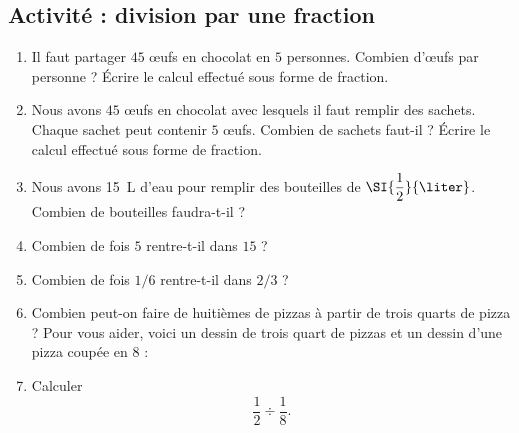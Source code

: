 
\subsection*{Activité : division par une fraction}

\begin{enumerate}
    \item
        Il faut partager \( 45\) œufs en chocolat en \( 5\) personnes. Combien d'œufs par personne ? Écrire le calcul effectué sous forme de fraction.
    \item
        Nous avons \( 45\) œufs en chocolat avec lesquels il faut remplir des sachets. Chaque sachet peut contenir \( 5\) œufs. Combien de sachets faut-il ? Écrire le calcul effectué sous forme de fraction.
    \item
        Nous avons \SI{15}{\liter} d'eau pour remplir des bouteilles de $\SI{\dfrac{ 1 }{ 2 }}{\liter}$. Combien de bouteilles faudra-t-il ?
    \item
        Combien de fois \( 5\) rentre-t-il dans \( 15\) ?
    \item
        Combien de fois \( 1/6\) rentre-t-il dans \( 2/3\) ?

\begin{center}
   
\end{center}
\begin{center}
   
\end{center}



    \item
        Combien peut-on faire de huitièmes de pizzas à partir de trois quarts de pizza ? Pour vous aider, voici un dessin de trois quart de pizzas et un dessin d'une pizza coupée en \( 8\) :
        \begin{center}
           
           
        \end{center}
    \item
        Calculer
        \begin{equation}
            \dfrac{ 1 }{ 2 }\div\frac{1}{ 8 }.
        \end{equation}
\end{enumerate}
